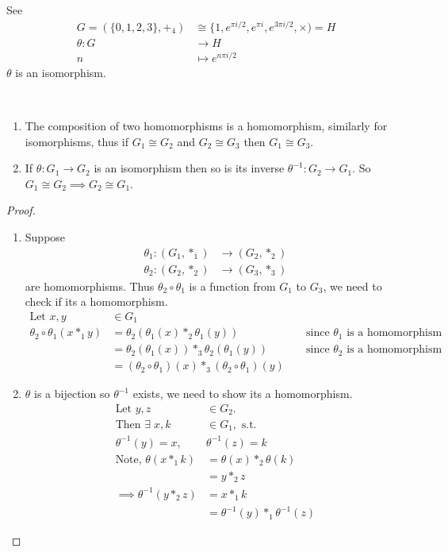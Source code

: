 See 
\begin{align*}
    G = (\{ 0, 1, 2, 3 \}, +_4) &\cong \{1, e^{\pi i/2}, e^{\pi i}, e^{3\pi i/2}, \times) = H \\
    \theta: G &\to H \\
    n &\mapsto e^{n \pi i /2}
\end{align*}
$\theta$ is an isomorphism.

\begin{lemma}~
  \vspace*{-1.5\baselineskip}
\begin{enumerate}
\def\labelenumi{\roman{enumi}.}
  \item The composition of two homomorphisms is a homomorphism, similarly for isomorphisms, thus if $G_1 \cong G_2$ and $G_2 \cong G_3$ then $G_1 \cong G_3$.
  \item
    If $\theta : G_1 \to G_2$ is an isomorphism then so is its inverse $\theta^{-1} : G_2 \to G_1$.
    So $G_1 \cong G_2 \implies G_2 \cong G_1$.
\end{enumerate}
\end{lemma}

\begin{proof} ~ 

\begin{enumerate}
\def\labelenumi{\roman{enumi}.}
  \item Suppose
  \begin{align*}
      \theta_1 : (G_1, *_1) &\to (G_2, *_2) \\
      \theta_2 : (G_2, *_2) &\to (G_3, *_3)
  \end{align*}
  are homomorphisms.
  Thus $\theta_2 \circ \theta_1$ is a function from $G_1$ to $G_3$, we need to check if its a homomorphism.
  \begin{align*}
      \text{Let } x, y &\in G_1 && \\
      \theta_2 \circ \theta_1 (x *_1 y) &= \theta_2(\theta_1(x) *_2 \theta_1(y)) & &\text{ since $\theta_1$ is a homomorphism} \\
      &= \theta_2(\theta_1(x)) *_3 \theta_2(\theta_1(y)) & &\text{ since $\theta_2$ is a homomorphism} \\
      &= (\theta_2 \circ \theta_1)(x) *_3 (\theta_2 \circ \theta_1)(y) &&
  \end{align*}
  \item
    $\theta$ is a bijection so $\theta^{-1}$ exists, we need to show its a homomorphism.
    \begin{align*}
    \text{Let } y, z &\in G_2. \\
    \text{Then } \exists \; x, k &\in G_1, \text{ s.t.} \\
    \theta^{-1}(y) = x,\ &\theta^{-1}(z) = k \\
    \text{Note, } \theta(x *_1 k) &= \theta(x) *_2 \theta(k) \\
    &= y *_2 z \\
    \implies \theta^{-1}(y *_2 z) &= x *_1 k \\
    &= \theta^{-1}(y) *_1 \theta^{-1}(z)
    \end{align*}
\end{enumerate}
\end{proof}

